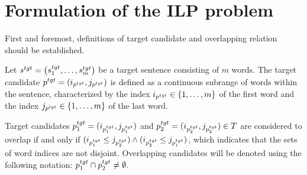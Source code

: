 \section{Formulation of the ILP problem}
First and foremost, definitions of target candidate and overlapping relation should be established.

\begin{definition}
  Let \( s^{tgt} = \left( s_1^{tgt}, \dots, s_m^{tgt} \right) \) be a target sentence consisting of \( m \) words.
  The target candidate \( p^{tgt} = (i_{p^{tgt}}, j_{p^{tgt}}) \) is defined as a continuous
  subrange of words within the sentence, characterized by the index \( i_{p^{tgt}} \in \{ 1, \dots, m \} \) of the first
  word and the index \( j_{p^{tgt}} \in \{ 1, \dots, m \} \) of the last word.
\end{definition}

\begin{definition} \label{def:overlapping}
  Target candidates \( p_1^{tgt} = (i_{p_1^{tgt}}, j_{p_1^{tgt}}) \) and \linebreak
  \( p_2^{tgt} = (i_{p_2^{tgt}}, j_{p_2^{tgt}}) \in T \) are considered to overlap
  if and only if \( ( i_{p_1^{tgt}} \leq j_{p_2^{tgt}} ) \land ( i_{p_2^{tgt}} \leq j_{p_1^{tgt}} ) \),
  which indicates that the sets of word indices are not disjoint. Overlapping candidates
  will be denoted using the following notation: \( p_1^{tgt} \cap p_2^{tgt} \neq \emptyset \).
\end{definition}

